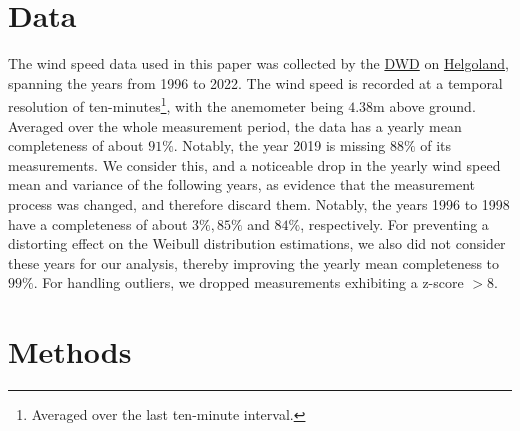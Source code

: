 \documentclass{article}
\theoremstyle{plain}
\theoremstyle{definition}
\theoremstyle{remark}
\begin{document}
\section{Data}\label{sec:data}

The wind speed data used in this paper was collected by the \href{https://www.dwd.de}{DWD} on
\href{https://www.openstreetmap.org/?mlat=54.1750&mlon=7.8920#map=15/54.1750/7.8920}{Helgoland},
spanning the years from 1996 to 2022. The wind speed is recorded at a temporal resolution of
ten-minutes\footnote{Averaged over the last ten-minute interval.}, with the anemometer being $4.38
\mathrm{m}$ above ground. Averaged over the whole measurement period, the data has a yearly mean
completeness of about $91\%$. Notably, the year 2019 is missing $88\%$ of its measurements. We
consider this, and a noticeable drop in the yearly wind speed mean and variance of the following
years, as evidence that the measurement process was changed, and therefore discard them. Notably,
the years 1996 to 1998 have a completeness of about $3\%, 85\%$ and $84\%$, respectively. For
preventing a distorting effect on the Weibull distribution estimations, we also did not consider
these years for our analysis, thereby improving the yearly mean completeness to $99\%$. For handling
outliers, we dropped measurements exhibiting a z-score $> 8$.

\section{Methods}\label{sec:methods}
\end{document}
